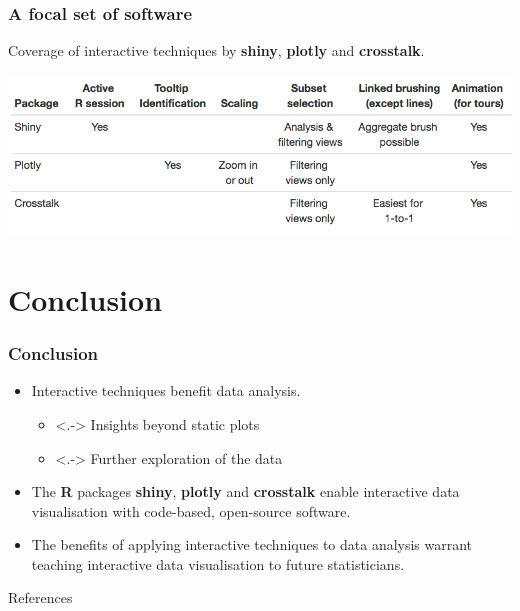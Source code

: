 \documentclass{beamer}
\begin{document}
\begin{frame}
		\frametitle{A focal set of software}
		Coverage of interactive techniques by \textbf{shiny}, \textbf{plotly} and \textbf{crosstalk}.
		\begin{center}
			\includegraphics[scale=0.38]{files/table.jpeg}
		\end{center}
\end{frame}

\section{Conclusion}
\label{sec:conclusion}

\begin{frame}
\frametitle{Conclusion}
	\begin{itemize}[<+->]
		\item Interactive techniques benefit data analysis.
		\begin{itemize} 
			\item <.-> Insights beyond static plots
			\item <.-> Further exploration of the data
		\end{itemize}
		\item The \textbf{R} packages \textbf{shiny}, \textbf{plotly} and \textbf{crosstalk} enable interactive data visualisation with code-based, open-source software.
		\item The benefits of applying interactive techniques to data analysis warrant teaching interactive data visualisation to future statisticians.
	\end{itemize}
\end{frame}

\begin{frame}[allowframebreaks]{References}
	
	
	\nocite{R}
	\nocite{plotly_R}
	\nocite{crosstalk_R}
	\nocite{shiny_R}
\end{frame}
\end{document}
